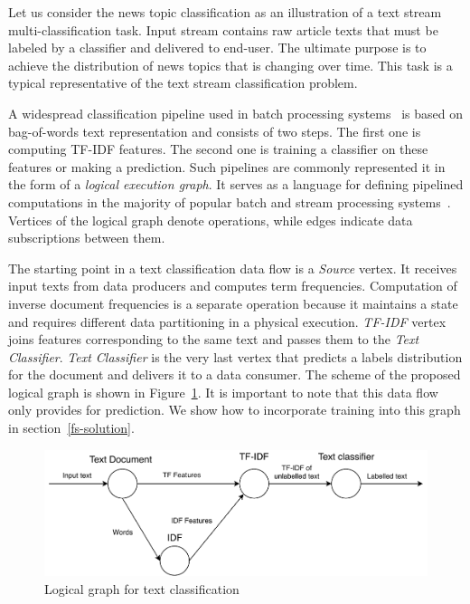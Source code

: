 \label{fs-framework}

Let us consider the news topic classification as an illustration of a text stream multi-classification task. Input stream contains raw article texts that must be labeled by a classifier and delivered to end-user. The ultimate purpose is to achieve the distribution of news topics that is changing over time. This task is a typical representative of the text stream classification problem.

A widespread classification pipeline used in batch processing systems~\cite{semberecki2016distributed} is based on bag-of-words text representation and consists of two steps. The first one is computing TF-IDF features. The second one is training a classifier on these features or making a prediction. Such pipelines are commonly represented it in the form of a {\em logical execution graph}. It serves as a language for defining pipelined computations in the majority of popular batch and stream processing systems~\cite{Carbone:2017:SMA:3137765.3137777, Zaharia:2016:ASU:3013530.2934664, apache:storm, Kulkarni:2015:THS:2723372.2742788, Noghabi:2017:SSS:3137765.3137770}. Vertices of the logical graph denote operations, while edges indicate data subscriptions between them. 

The starting point in a text classification data flow is a {\em Source} vertex. It receives input texts from data producers and computes term frequencies. Computation of inverse document frequencies is a separate operation because it maintains a state and requires different data partitioning in a physical execution. {\em TF-IDF} vertex joins features corresponding to the same text and passes them to the {\em Text Classifier}. {\em Text Classifier} is the very last vertex that predicts a labels distribution for the document and delivers it to a data consumer. The scheme of the proposed logical graph is shown in Figure~\ref{logical_graph}. It is important to note that this data flow only provides for prediction. 
We show how to incorporate training into this graph  in section~\ref{fs-solution}.


\begin{figure}[htbp]
  \centering
  \includegraphics[scale=0.52]{pics/logical-graph-no-part-fit}
  \caption{Logical graph for text classification}
  \label {logical_graph}
\end{figure}

